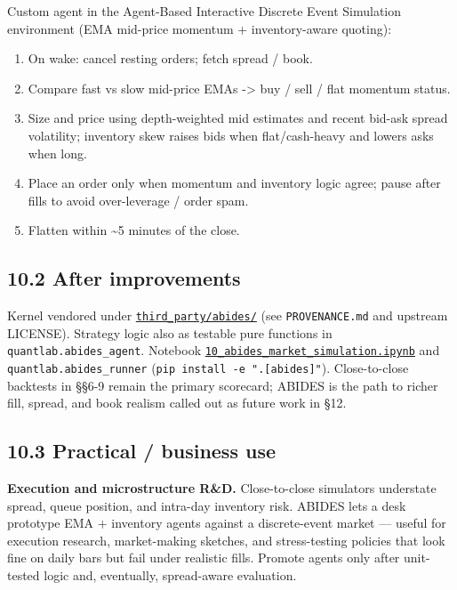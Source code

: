 \documentclass[
  11pt,
]{article}
\providecommand{\tightlist}{%
  \setlength{\itemsep}{0pt}\setlength{\parskip}{0pt}}
\begin{document}
Custom agent in the Agent-Based Interactive Discrete Event Simulation
environment (EMA mid-price momentum + inventory-aware quoting):

\begin{enumerate}
\def\labelenumi{\arabic{enumi}.}
\tightlist
\item
  On wake: cancel resting orders; fetch spread / book.\\
\item
  Compare fast vs slow mid-price EMAs -\textgreater{} buy / sell / flat
  momentum status.\\
\item
  Size and price using depth-weighted mid estimates and recent bid-ask
  spread volatility; inventory skew raises bids when flat/cash-heavy and
  lowers asks when long.\\
\item
  Place an order only when momentum and inventory logic agree; pause
  after fills to avoid over-leverage / order spam.\\
\item
  Flatten within \textasciitilde5 minutes of the close.
\end{enumerate}

\subsection{10.2 After improvements}\label{after-improvements-4}

Kernel vendored under
\href{../third_party/abides/}{\texttt{third\_party/abides/}} (see
\texttt{PROVENANCE.md} and upstream LICENSE). Strategy logic also as
testable pure functions in \texttt{quantlab.abides\_agent}. Notebook
\href{../notebooks/10_abides_market_simulation.ipynb}{\texttt{10\_abides\_market\_simulation.ipynb}}
and \texttt{quantlab.abides\_runner}
(\texttt{pip\ install\ -e\ ".{[}abides{]}"}). Close-to-close backtests
in §§6-9 remain the primary scorecard; ABIDES is the path to richer
fill, spread, and book realism called out as future work in §12.

\subsection{10.3 Practical / business
use}\label{practical-business-use-8}

\textbf{Execution and microstructure R\&D.} Close-to-close simulators
understate spread, queue position, and intra-day inventory risk. ABIDES
lets a desk prototype EMA + inventory agents against a discrete-event
market --- useful for execution research, market-making sketches, and
stress-testing policies that look fine on daily bars but fail under
realistic fills. Promote agents only after unit-tested logic and,
eventually, spread-aware evaluation.
\end{document}
